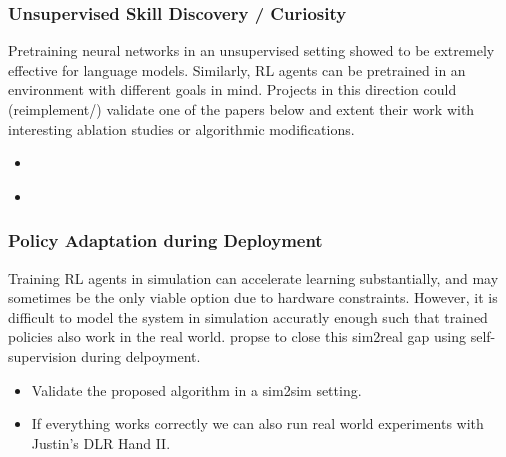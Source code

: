 \documentclass[a4paper]{article}
\begin{document}
\subsubsection{Unsupervised Skill Discovery / Curiosity}
Pretraining neural networks in an unsupervised setting showed to be extremely effective for language models. Similarly, RL agents can be pretrained in an environment with different goals in mind. Projects in this direction could (reimplement/) validate one of the papers below and extent their work with interesting ablation studies or algorithmic modifications.
\begin{itemize}
  \item \cite{Plan2Explore2020}
  \item \cite{DADS2020}
\end{itemize}

\subsubsection{Policy Adaptation during Deployment}
Training RL agents in simulation can accelerate learning substantially, and may sometimes be the only viable option due to hardware constraints. However, it is difficult to model the system in simulation accuratly enough such that trained policies also work in the real world. \cite{Hansen2021} propse to close this sim2real gap using self-supervision during delpoyment.
\begin{itemize}
  \item Validate the proposed algorithm in a sim2sim setting.
  \item If everything works correctly we can also run real world experiments with Justin's DLR Hand II.
\end{itemize}





\end{document}
